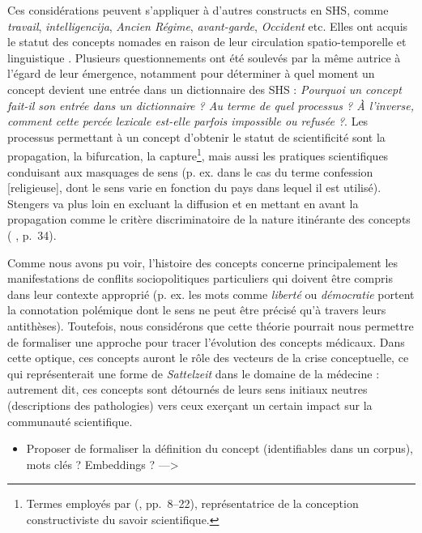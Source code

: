 Ces considérations peuvent s'appliquer à d'autres constructs en SHS, comme \textit{travail}, \textit{intelligencija}, \textit{Ancien Régime}, \textit{avant-garde}, \textit{Occident} etc. Elles ont acquis le statut des concepts \og{}nomades\fg{} en raison de leur circulation spatio-temporelle et linguistique \citep[p. 117]{ghermani2011}. Plusieurs questionnements ont été soulevés par la même autrice à l'égard de leur émergence, notamment pour déterminer à quel moment un concept devient une entrée dans un dictionnaire des \textsc{SHS} : \og{}\textit{Pourquoi un concept fait-il son entrée dans un dictionnaire ? Au terme de quel processus ? À l'inverse, comment cette percée lexicale est-elle parfois impossible ou refusée ?}\fg{}. Les processus permettant à un concept d'obtenir le statut de scientificité sont la propagation, la bifurcation, la capture\footnote{Termes employés par \citeauthor{stengers1987d} (\citeyear{stengers1987d}, pp.~8--22), représentatrice de la conception constructiviste du savoir scientifique.}, mais aussi les pratiques scientifiques conduisant aux masquages de sens (p. ex. dans le cas du terme \og{}confession [religieuse]\fg{}, dont le sens varie en fonction du pays dans lequel il est utilisé). Stengers va plus loin en excluant la \og diffusion \fg{} et en mettant en avant la \og propagation \fg{} comme le critère discriminatoire de la nature itinérante des concepts (\citeauthor{bal2002travelling} \citeyear{bal2002travelling}, p.~34). 

Comme nous avons pu voir, l'histoire des concepts concerne principalement les manifestations de conflits sociopolitiques particuliers qui doivent être compris dans leur contexte approprié (p. ex. les mots comme \textit{liberté} ou \textit{démocratie} portent la connotation polémique dont le sens ne peut être précisé qu'à travers leurs antithèses). Toutefois, nous considérons que cette théorie pourrait nous permettre de formaliser une approche pour tracer l'évolution des concepts médicaux. Dans cette optique, ces concepts auront le rôle des vecteurs de la crise conceptuelle, ce qui représenterait une forme de \textit{Sattelzeit} dans le domaine de la médecine : autrement dit, ces concepts sont détournés de leurs sens initiaux neutres (descriptions des pathologies) vers ceux exerçant un certain impact sur la communauté scientifique. 
\begin{itemize}
\item Proposer de formaliser la définition du concept (identifiables dans un corpus), mots clés ? Embeddings ? —> 
\end{itemize}





